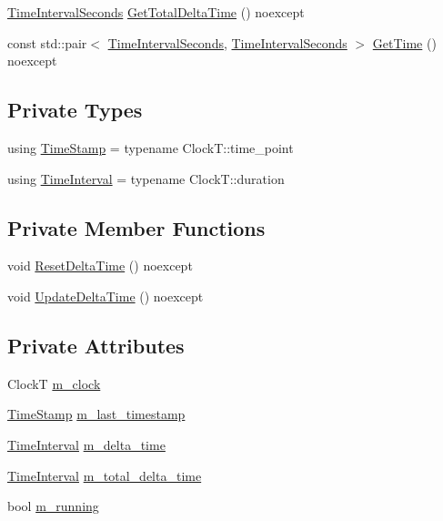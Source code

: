 \begin{DoxyCompactItemize}
\item 
\mbox{\hyperlink{namespacemage_a21c3d1575018d1e0720948713c76be1f}{Time\+Interval\+Seconds}} \mbox{\hyperlink{classmage_1_1_timer_a3e46853855b650ee76ba789dbf2dafae}{Get\+Total\+Delta\+Time}} () noexcept
\item 
const std\+::pair$<$ \mbox{\hyperlink{namespacemage_a21c3d1575018d1e0720948713c76be1f}{Time\+Interval\+Seconds}}, \mbox{\hyperlink{namespacemage_a21c3d1575018d1e0720948713c76be1f}{Time\+Interval\+Seconds}} $>$ \mbox{\hyperlink{classmage_1_1_timer_a5b8ce55b7225b43a59b591bc8734185f}{Get\+Time}} () noexcept
\end{DoxyCompactItemize}
\subsection*{Private Types}
\begin{DoxyCompactItemize}
\item 
using \mbox{\hyperlink{classmage_1_1_timer_abd11aea6107940b09ef3c48f62c81668}{Time\+Stamp}} = typename Clock\+T\+::time\+\_\+point
\item 
using \mbox{\hyperlink{classmage_1_1_timer_a5c0fd78ceab0110637622bd0e9b8424d}{Time\+Interval}} = typename Clock\+T\+::duration
\end{DoxyCompactItemize}
\subsection*{Private Member Functions}
\begin{DoxyCompactItemize}
\item 
void \mbox{\hyperlink{classmage_1_1_timer_a9afe1eae8a5edbc4b15d7eefab417dc0}{Reset\+Delta\+Time}} () noexcept
\item 
void \mbox{\hyperlink{classmage_1_1_timer_a496453325487b638f5959daa24719a2b}{Update\+Delta\+Time}} () noexcept
\end{DoxyCompactItemize}
\subsection*{Private Attributes}
\begin{DoxyCompactItemize}
\item 
ClockT \mbox{\hyperlink{classmage_1_1_timer_ad46016090f9ae8a282398d8fcc8e9e0e}{m\+\_\+clock}}
\item 
\mbox{\hyperlink{classmage_1_1_timer_abd11aea6107940b09ef3c48f62c81668}{Time\+Stamp}} \mbox{\hyperlink{classmage_1_1_timer_a01e35b71a5fe5eebe3b05c1b675cb5ce}{m\+\_\+last\+\_\+timestamp}}
\item 
\mbox{\hyperlink{classmage_1_1_timer_a5c0fd78ceab0110637622bd0e9b8424d}{Time\+Interval}} \mbox{\hyperlink{classmage_1_1_timer_a9cb9bf6cd0f567a8a1fad02a89d98aa2}{m\+\_\+delta\+\_\+time}}
\item 
\mbox{\hyperlink{classmage_1_1_timer_a5c0fd78ceab0110637622bd0e9b8424d}{Time\+Interval}} \mbox{\hyperlink{classmage_1_1_timer_aa62b280ee2b58a3f75440cc4faf10b23}{m\+\_\+total\+\_\+delta\+\_\+time}}
\item 
bool \mbox{\hyperlink{classmage_1_1_timer_a195789c583eb8bd3b9f0058214b74bc5}{m\+\_\+running}}
\end{DoxyCompactItemize}


